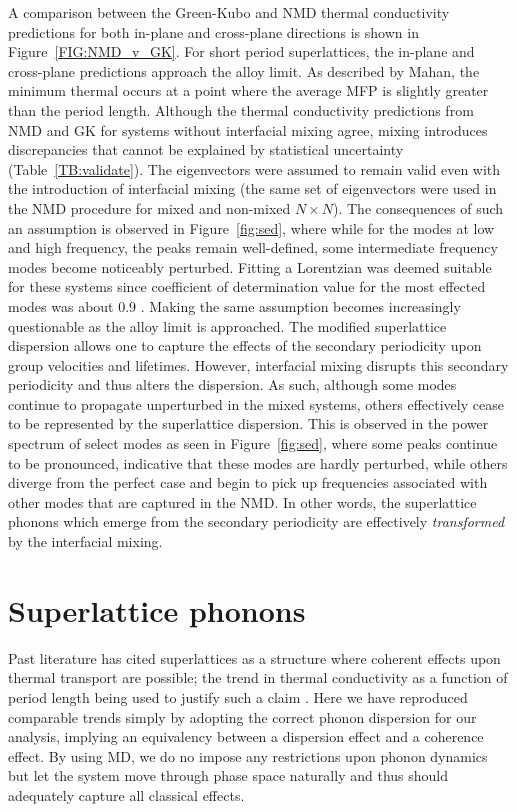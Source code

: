 \documentclass[aps,prb,preprint,preprintnumbers,amsmath,amssymb,floatfix,superscriptaddress]{revtex4}
\begin{document}
A comparison between the Green-Kubo and NMD thermal conductivity predictions for both in-plane and cross-plane directions is shown in Figure~\ref{FIG:NMD_v_GK}. For short period superlattices, the in-plane and cross-plane predictions approach the alloy limit. As described by Mahan, the minimum thermal occurs at a point where the average MFP is slightly greater than the period length. Although the thermal conductivity predictions from NMD and GK for systems without interfacial mixing agree, mixing introduces discrepancies that cannot be explained by statistical uncertainty (Table~\ref{TB:validate}). The eigenvectors were assumed to remain valid even with the introduction of interfacial mixing (the same set of eigenvectors were used in the NMD procedure for mixed and non-mixed $N\times N$). The consequences of such an assumption is observed in Figure~\ref{fig:sed}, where while for the modes at low and high frequency, the peaks remain well-defined, some intermediate frequency modes become noticeably perturbed. Fitting a Lorentzian was deemed suitable for these systems since coefficient of determination value for the most effected modes was about 0.9 \cite{Cowpe20081066}. Making the same assumption becomes increasingly questionable as the alloy limit is approached. The modified superlattice dispersion allows one to capture the effects of the secondary periodicity upon group velocities and lifetimes. However, interfacial mixing disrupts this secondary periodicity and thus alters the dispersion. As such, although some modes continue to propagate unperturbed in the mixed systems, others effectively cease to be represented by the superlattice dispersion. This is observed in the power spectrum of select modes as seen in Figure~\ref{fig:sed}, where some peaks continue to be pronounced, indicative that these modes are hardly perturbed, while others diverge from the perfect case and begin to pick up frequencies associated with other modes that are captured in the NMD. In other words, the superlattice phonons which emerge from the secondary periodicity are effectively \textit{transformed} by the interfacial mixing.

\section{Superlattice phonons}

Past literature has cited superlattices as a structure where coherent effects upon thermal transport are possible; the trend in thermal conductivity as a function of period length being used to justify such a claim \cite{PhysRevB.67.195311} \cite{}. Here we have reproduced comparable trends simply by adopting the correct phonon dispersion for our analysis, implying an equivalency between a dispersion effect and a coherence effect. By using MD, we do no impose any restrictions upon phonon dynamics but let the system move through phase space naturally and thus should adequately capture all classical effects.
\end{document}
